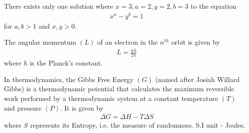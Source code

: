 \documentclass{article}
\begin{document}
\begin{mathbox}
There exists only {one solution} where $x=3, a=2, y=2, b=3$ to the equation
\begin{align*} 
    x^a - y^b = 1
\end{align*} 
for {$a,b > 1$} and {$x,y > 0$}.
\end{mathbox}
\begin{phybox}
The {angular momentum} $(L)$ of an {electron} in the $n^{th}$ orbit is given by 
\begin{align*} 
    L = \frac{nh}{2\pi} 
\end{align*} where $h$ is the {Planck's constant}. 
\end{phybox}
\begin{chembox}
In thermodynamics, the {Gibbs Free Energy} $(G)$ (named after Josiah Willard Gibbs) is a {thermodynamic potential} that calculates the {maximum reversible work} performed by a thermodynamic system at a {constant temperature} $(T)$ and pressure{} $(P)$. It is given by 
\begin{align*} 
    \Delta G=\Delta H-T\Delta S 
\end{align*} where $S$ represents its {Entropy}, i.e. the measure of randomness. {S.I unit - Joules}.
\end{chembox}
\end{document}
